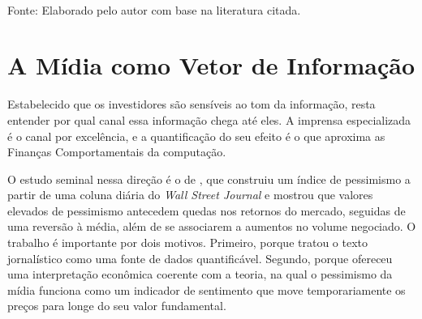 \begin{table}[htpb]
\centering
\caption{Principais vieses comportamentais e suas implicações para o efeito do sentimento das notícias.}
\label{tab:vieses}
\vspace{0.2cm}
{\small \\ Fonte: Elaborado pelo autor com base na literatura citada.}
\end{table}

\section{A Mídia como Vetor de Informação}

Estabelecido que os investidores são sensíveis ao tom da informação, resta entender por qual canal essa informação chega até eles. A imprensa especializada é o canal por excelência, e a quantificação do seu efeito é o que aproxima as Finanças Comportamentais da computação.

O estudo seminal nessa direção é o de , que construiu um índice de pessimismo a partir de uma coluna diária do \textit{Wall Street Journal} e mostrou que valores elevados de pessimismo antecedem quedas nos retornos do mercado, seguidas de uma reversão à média, além de se associarem a aumentos no volume negociado. O trabalho é importante por dois motivos. Primeiro, porque tratou o texto jornalístico como uma fonte de dados quantificável. Segundo, porque ofereceu uma interpretação econômica coerente com a teoria, na qual o pessimismo da mídia funciona como um indicador de sentimento que move temporariamente os preços para longe do seu valor fundamental.


